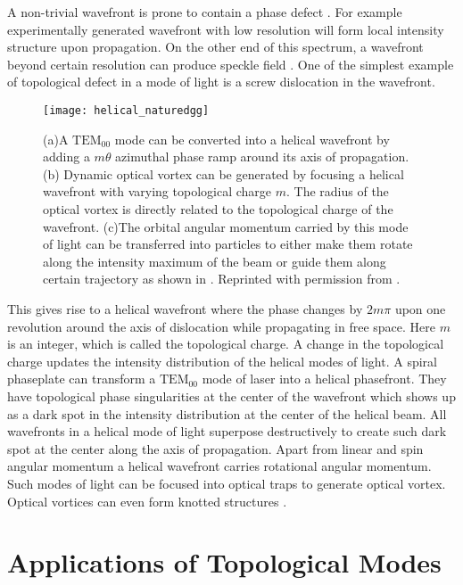 A non-trivial wavefront is prone to contain a phase defect \cite{Bazhenov1992}. For example experimentally generated wavefront with low resolution will form local intensity structure upon propagation. On the other end of this spectrum, a wavefront beyond certain resolution can produce speckle field \cite{Indebetouw1993}. One of the simplest example of topological defect in a mode of light is a screw dislocation \cite{Bazhenov1992} in the wavefront.
\begin{figure}[t!]
  \centering
  \texttt{[image: helical\_naturedgg]}
  \caption{(a)A $\mathrm{TEM}_{00}$ mode can be converted into a helical wavefront by adding a $m\theta$ azimuthal phase ramp around its axis of propagation. (b) Dynamic optical vortex can be generated by focusing a helical wavefront with varying topological charge $m$. The radius of the optical vortex is directly related to the topological charge of the wavefront. (c)The orbital angular momentum carried by this mode of light can be transferred into particles to either make them rotate along the intensity maximum of the beam or guide them along certain trajectory as shown in  \cite{Curtis:03}. Reprinted with permission from \cite{grier2003nature}.}
  \label{fig:helical}
\end{figure}
This gives rise to a helical wavefront where the phase changes by $2m\pi$ upon one revolution around the axis of dislocation while propagating in free space. Here $m$ is an integer, which is called the topological charge. A change in the topological charge updates the intensity distribution of the helical modes of light. A spiral phaseplate \cite{BEIJERSBERGEN1994321} can transform a  $\mathrm{TEM}_{00}$ mode of laser into a helical phasefront. They have topological phase singularities at the center of the wavefront \cite{Bazhenov1992,nye1997} which shows up as a dark spot in the intensity distribution at the center of the helical beam. All wavefronts in a helical mode of light superpose destructively to create such dark spot at the center along the axis of propagation. Apart from linear and spin angular momentum a helical wavefront carries rotational angular momentum. Such modes of light can be focused into optical traps to generate optical vortex. Optical vortices can even form knotted structures \cite{leach2004}. 


\section{Applications of Topological Modes}

